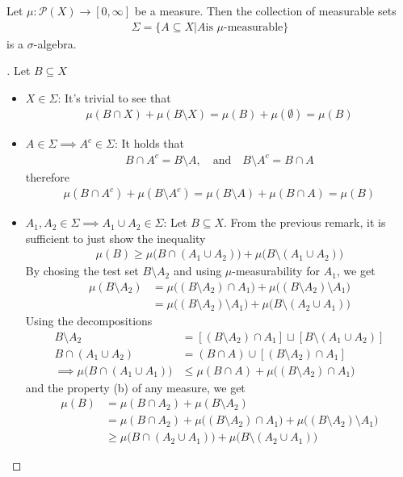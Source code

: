 \begin{thm}[]
  Let $\mu: \mathcal{P}(X) \to [0,\infty]$ be a measure. Then the collection of measurable sets
  \begin{align*}
    \Sigma = \{A \subseteq X \big\vert A \text{is $\mu$-measurable}\}
  \end{align*}
  is a $\sigma$-algebra.
\end{thm}
\begin{proof}[]
Let $B \subseteq X$
\begin{itemize}
  \item $X\in \Sigma$: It's trivial to see that
    \begin{align*}
      \mu(B \cap X) + \mu(B \setminus X) = \mu(B) + \mu(\emptyset) = \mu(B)
    \end{align*}
  \item $A \in \Sigma \implies A^{c} \in \Sigma$: It holds that
    \begin{align*}
      B \cap A^{c} = B \setminus A, \quad \text{and} \quad B \setminus A^{c} = B \cap A
    \end{align*}
    therefore
    \begin{align*}
      \mu(B \cap A^{c}) + \mu(B \setminus A^{c}) = \mu(B \setminus A) + \mu(B \cap A) = \mu(B)
    \end{align*}
  \item $A_1,A_2 \in \Sigma \implies A_1 \cup A_2 \in \Sigma$: Let $B \subseteq X$. From the previous remark, it is sufficient to just show the inequality
    \begin{align*}
      \mu(B) \geq \mu\big(B \cap (A_1 \cup A_2)\big) + \mu \big(B \setminus (A_1 \cup A_2)\big)
    \end{align*}
    By chosing the test set $B \setminus A_2$ and using $\mu$-measurability for $A_1$, we get
    \begin{align*}
      \mu(B \setminus A_2) &= \mu\big((B \setminus A_2) \cap A_1\big) + \mu \big((B \setminus A_2) \setminus A_1\big)\\
                           &= \mu \big((B \setminus A_2) \setminus A_1\big) + \mu \big(B \setminus (A_2 \cup A_1)\big)
    \end{align*}
    Using the decompositions
    \begin{align*}
      B \setminus A_2 &= [(B \setminus A_2) \cap A_1] \sqcup [B \setminus (A_1 \cup A_2)]\\
      B \cap (A_1 \cup A_2) &= (B \cap A) \cup [(B \setminus A_2) \cap A_1]\\
      \implies \mu\big(B \cap (A_1 \cup A_1)\big) &\leq \mu(B \cap A) + \mu \big((B \setminus A_2) \cap A_1\big)
    \end{align*}
    and the property (b) of any measure, we get
    \begin{align*}
      \mu(B) &= \mu(B \cap A_2) + \mu(B \setminus A_2)\\
             &= \mu(B \cap A_2) + \mu \big((B \setminus A_2) \cap A_1\big) + \mu \big((B \setminus A_2) \setminus A_1\big)\\
             &\geq \mu \big(B \cap (A_2 \cup A_1)\big) + \mu \big(B \setminus (A_2 \cup A_1)\big)
    \end{align*}


\end{itemize}
\end{proof}
